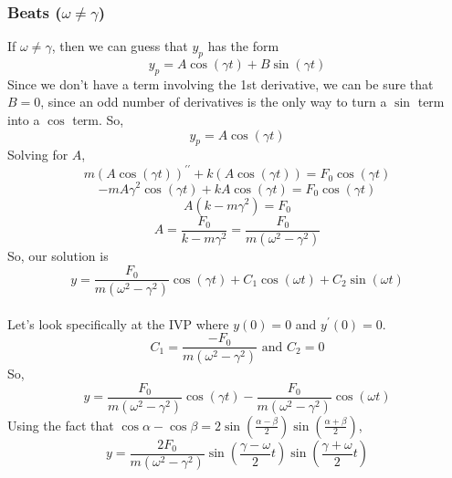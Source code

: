 \subsubsection{Beats ($\omega \neq \gamma$)}
\noindent
If $\omega \neq \gamma$, then we can guess that $y_p$ has the form
\begin{equation*}
	y_p = A\cos{(\gamma t)} + B\sin{(\gamma t)}
\end{equation*}
Since we don't have a term involving the 1st derivative, we can be sure that $B = 0$, since an odd number of derivatives is the only way to turn a $\sin$ term into a $\cos$ term. So,
\begin{equation*}
	y_p = A\cos{(\gamma t)}
\end{equation*}
Solving for $A$,
\begin{equation*}
	m\left(A\cos{(\gamma t)}\right)^{\prime\prime} + k\left(A\cos{(\gamma t)}\right) = F_0\cos{(\gamma t)}
\end{equation*}
\begin{equation*}
	-mA\gamma^2\cos{(\gamma t)} + kA\cos{(\gamma t)} = F_0\cos{(\gamma t)}
\end{equation*}
\begin{equation*}
	A\left(k - m\gamma^2\right) = F_0
\end{equation*}
\begin{equation*}
	A = \frac{F_0}{k - m\gamma^2} = \frac{F_0}{m(\omega^2 - \gamma^2)}
\end{equation*}
So, our solution is
\begin{equation*}
	y = \frac{F_0}{m(\omega^2 - \gamma^2)}\cos{(\gamma t)} + C_1\cos{(\omega t)} + C_2\sin{(\omega t)}
\end{equation*}\\

\noindent
Let's look specifically at the IVP where $y(0) = 0$ and $y^\prime(0) = 0$.
\begin{equation*}
	C_1 = \frac{-F_0}{m(\omega^2 - \gamma^2)} \text{ and } C_2 = 0
\end{equation*}
So,
\begin{equation*}
	y = \frac{F_0}{m(\omega^2 - \gamma^2)}\cos{(\gamma t)} - \frac{F_0}{m(\omega^2 - \gamma^2)}\cos{(\omega t)}
\end{equation*}
Using the fact that $\cos{\alpha}-\cos{\beta} = 2\sin{\left(\frac{\alpha - \beta}{2}\right)}\sin{\left(\frac{\alpha + \beta}{2}\right)}$,
\begin{equation*}
	y = \frac{2F_0}{m(\omega^2 - \gamma^2)}\sin{\left(\frac{\gamma - \omega}{2}t\right)}\sin{\left(\frac{\gamma + \omega}{2}t\right)}
\end{equation*}\\

